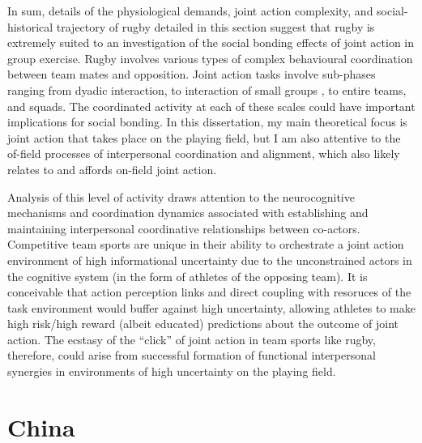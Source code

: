 \begin{CJK}{UTF8}{gbsn}
In sum, details of the physiological demands, joint action complexity, and social-historical trajectory of rugby detailed in this section suggest that rugby is extremely suited to an investigation of the social bonding effects of joint action in group exercise.  Rugby involves various types of complex behavioural coordination between team mates and opposition.  Joint action tasks involve sub-phases ranging from dyadic interaction, to interaction of small groups , to entire teams, and squads.  The coordinated activity at each of these scales could have important implications for social bonding.  In this dissertation, my main theoretical focus is joint action that takes place on the playing field, but I am also attentive to the of-field processes of interpersonal coordination and alignment, which also likely relates to and affords on-field joint action.

Analysis of this level of activity draws attention to the neurocognitive mechanisms and coordination dynamics associated with establishing and maintaining interpersonal coordinative relationships between co-actors.  Competitive team sports are unique in their ability to orchestrate a joint action environment of high informational uncertainty due to the unconstrained actors in the cognitive system (in the form of athletes of the opposing team).  It is conceivable that action perception links and direct coupling with resoruces of the task environment would buffer against high uncertainty, allowing athletes to make high risk/high reward (albeit educated) predictions about the outcome of joint action.  The ecstasy of the ``click'' of joint action in team sports like rugby, therefore, could arise from successful formation of functional interpersonal synergies in environments of high uncertainty on the playing field.

















\section{China}


\end{CJK}
